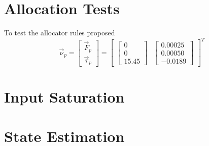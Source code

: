 \section{Allocation Tests}
\label{sec:simulation.allocator}


To test the allocator rules proposed
\begin{equation}
\vec{\nu}_p=\begin{bmatrix}
\vec{F}_p\\
\vec{\tau}_p
\end{bmatrix}
=
\begin{bmatrix}
\begin{bmatrix}
0\\
0\\
15.45
\end{bmatrix}
&
\begin{bmatrix}
0.00025\\
0.00050\\
-0.0189
\end{bmatrix}
\end{bmatrix}^T
\end{equation}
\section{Input Saturation}
\label{sec:simulation.saturation}

\section{State Estimation}
\label{sec:simulation.state}

